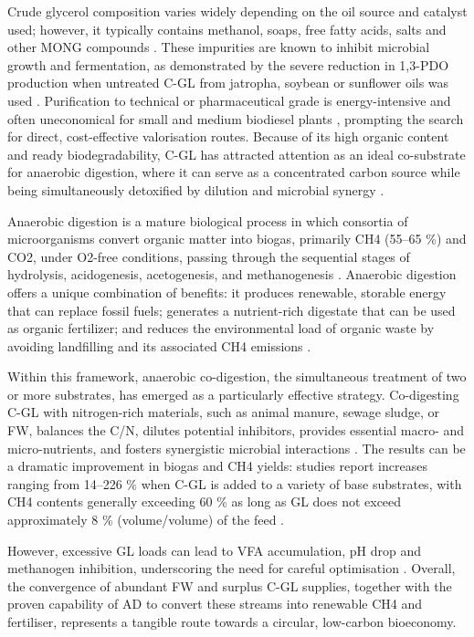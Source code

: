\documentclass[12pt, a4paper, oneside]{report}
\begin{document}
Crude glycerol composition varies widely depending on the oil source and catalyst used; however, it typically contains methanol, soaps, free fatty acids, salts and other MONG compounds \parencite{anand2012, attarbachi2023}. These impurities are known to inhibit microbial growth and fermentation, as demonstrated by the severe reduction in 1,3-PDO production when untreated C-GL from jatropha, soybean or sunflower oils was used \parencite{anand2012}. Purification to technical or pharmaceutical grade is energy-intensive and often uneconomical for small and medium biodiesel plants \parencite{attarbachi2023}, prompting the search for direct, cost-effective valorisation routes. Because of its high organic content and ready biodegradability, C-GL has attracted attention as an ideal co-substrate for anaerobic digestion, where it can serve as a concentrated carbon source while being simultaneously detoxified by dilution and microbial synergy \parencite{gebreegziabher2025, tomczak2025}.

Anaerobic digestion is a mature biological process in which consortia of microorganisms convert organic matter into biogas, primarily CH4 (55–65 \%) and CO2, under O2-free conditions, passing through the sequential stages of hydrolysis, acidogenesis, acetogenesis, and methanogenesis \parencite{gebreegziabher2025}. Anaerobic digestion offers a unique combination of benefits: it produces renewable, storable energy that can replace fossil fuels; generates a nutrient-rich digestate that can be used as organic fertilizer; and reduces the environmental load of organic waste by avoiding landfilling and its associated CH4 emissions \parencite{scherhaufer2018, gebreegziabher2025}.

Within this framework, anaerobic co-digestion, the simultaneous treatment of two or more substrates, has emerged as a particularly effective strategy. Co-digesting C-GL with nitrogen-rich materials, such as animal manure, sewage sludge, or FW, balances the C/N, dilutes potential inhibitors, provides essential macro- and micro-nutrients, and fosters synergistic microbial interactions \parencite{tomczak2025, gebreegziabher2025}. The results can be a dramatic improvement in biogas and CH4 yields: studies report increases ranging from 14–226 \% when C-GL is added to a variety of base substrates, with CH4 contents generally exceeding 60 \% as long as GL does not exceed approximately 8 \% (volume/volume) of the feed \parencite{gebreegziabher2025, tomczak2025}.

However, excessive GL loads can lead to VFA accumulation, pH drop and methanogen inhibition, underscoring the need for careful optimisation \parencite{gebreegziabher2025, tomczak2025}. Overall, the convergence of abundant FW and surplus C-GL supplies, together with the proven capability of AD to convert these streams into renewable CH4 and fertiliser, represents a tangible route towards a circular, low-carbon bioeconomy.
\end{document}
